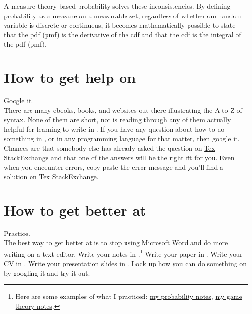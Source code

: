\documentclass[12pt, notitlepage]{article}
\begin{document}
A measure theory-based probability solves these inconsistencies. By defining probability as a measure on a measurable set, regardless of whether our random variable is discrete or continuous, it becomes mathematically possible to state that the pdf (pmf) is the derivative of the cdf and that the cdf is the integral of the pdf (pmf). 


\section{How to get help on \latex}

{\LARGE Google it.}\\

There are many ebooks, books, and websites out there illustrating the A to Z of \latex syntax. None of them are short, nor is reading through any of them actually helpful for learning to write in \latex. If you have any question about how to do something in \latex, or in any programming language for that matter, then google it. Chances are that somebody else has already asked the question on \href{https://tex.stackexchange.com/}{Tex StackExchange} and that one of the answers will be the right fit for you. Even when you encounter errors, copy-paste the error message and you'll find a solution on \href{https://tex.stackexchange.com/}{Tex StackExchange}. 

\section{How to get better at \latex}

{\LARGE Practice.}\\

The best way to get better at \latex is to stop using Microsoft Word and do more writing on a \latex text editor. Write your notes in \latex.\footnote{Here are some examples of what I practiced: \href{https://drive.google.com/file/d/0B1KGXZttjtvpZ21OeTE2RW4xLUU/view?usp=sharing}{my probability notes},  \href{https://drive.google.com/drive/folders/0B1KGXZttjtvpd2xHaU9WcFN2OFk}{my game theory notes}.} Write your paper in \latex. Write your CV in \latex. Write your presentation slides in \latex. Look up how you can do something on \latex by googling it and try it out. 


\newpage
\end{document}
